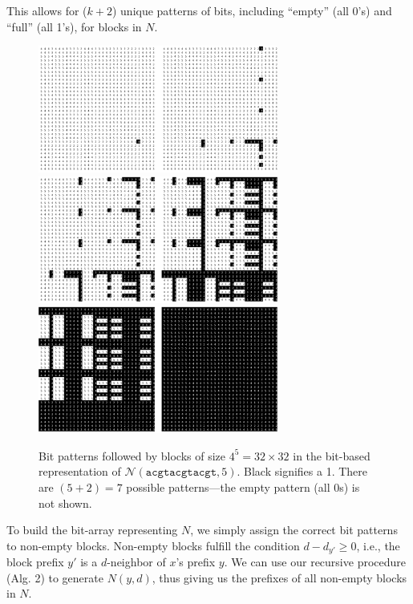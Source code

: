 \documentclass{acm_proc_article-sp}
\begin{document}
\begin{enumerate}
			This allows for ($k + 2$) unique patterns of bits, including ``empty'' (all 0's) and ``full'' (all 1's), for blocks in $N$.\newline
			\begin{figure}[h]
				\centering
				\label{fig:bit_patterns}
				\includegraphics[width=3.1in]{img/0-1}\vspace*{5pt}
				\includegraphics[width=3.1in]{img/2-3}\vspace*{5pt}
				\includegraphics[width=3.1in]{img/4-5}
				\caption{\small Bit patterns followed by blocks of size $4^{5}=32\times32$ in the bit-based representation of $\mathcal{N}(\texttt{acgtacgtacgt},5)$. Black signifies a 1. There are $(5+2)=7$ possible patterns---the empty pattern (all 0s) is not shown.}
				\end{figure}
			\newpage

		\end{enumerate}
			To build the bit-array representing $N$, we simply assign the correct bit patterns to non-empty blocks. Non-empty blocks fulfill the condition $d-d_{y'} \geq 0$, i.e., the block prefix $y'$ is a $d$-neighbor of $x$'s prefix $y$. We can use our recursive procedure (Alg. 2) to generate $N(y,d)$, thus giving us the prefixes of all non-empty blocks in $N$.
\end{document}
